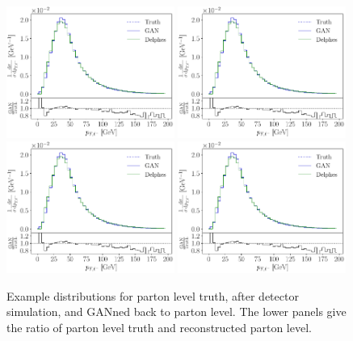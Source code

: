 \begin{figure}[t]
\centering
\includegraphics[page = 2, width=0.49\textwidth]{figures/cGAN/GAN_ratio}
\includegraphics[page = 3, width=0.49\textwidth]{figures/cGAN/GAN_ratio} \\
\includegraphics[page = 1, width=0.49\textwidth]{figures/cGAN/GAN_ratio}
\includegraphics[page = 4, width=0.49\textwidth]{figures/cGAN/GAN_ratio}
\caption{Example distributions for parton level truth, after
  detector simulation, and GANned back to parton level. The lower
  panels give the ratio of parton level truth and
  reconstructed parton level.}
\label{fig:distributions_GAN}
\end{figure}
